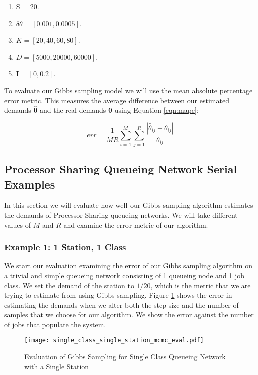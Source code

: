 \documentclass[a4paper,11pt,titlepage]{article}
\begin{document}
\begin{enumerate}
    \item S = 20.
    \item $\delta \theta = [0.001,0.0005]$.
    \item $K = [20,40,60,80]$.
    \item $D = [5000, 20000, 60000]$.
    \item $\mathbf{I} = [0,0.2]$.
\end{enumerate}

To evaluate our Gibbs sampling model we will use the mean absolute percentage error metric. This measures the average difference between our estimated demands $\hat{\bm{\theta}}$ and the real demands $\bm{\theta}$ using Equation \ref{eqn:mape}:

\begin{equation}
    err = \frac{1}{MR} \sum_{i=1}^{M} \sum_{j=1}^{R} \frac{|\hat{\theta}_{ij} - \theta_{ij}|}{\theta_{ij}}
    \label{eqn:mape}
\end{equation}

\subsection{Processor Sharing Queueing Network Serial Examples}

In this section we will evaluate how well our Gibbs sampling algorithm estimates the demands of Processor Sharing queueing networks. We will take different values of $M$ and $R$ and examine the error metric of our algorithm. 

\subsubsection{Example 1: 1 Station, 1 Class}

We start our evaluation examining the error of our Gibbs sampling algorithm on a trivial and simple queueing network consisting of 1 queueing node and 1 job class. We set the demand of the station to $1/20$, which is the metric that we are trying to estimate from using Gibbs sampling. Figure \ref{fig:M1R1_eval_gibbs} shows the error in estimating the demands when we alter both the step-size and the number of samples that we choose for our algorithm. We show the error against the number of jobs that populate the system. \\

\begin{figure}[h!]
\begin{center}
\texttt{[image: single\_class\_single\_station\_mcmc\_eval.pdf]}
\caption{Evaluation of Gibbs Sampling for Single Class Queueing Network with a Single Station }
\label{fig:M1R1_eval_gibbs}
\end{center}
\end{figure}
\end{document}
